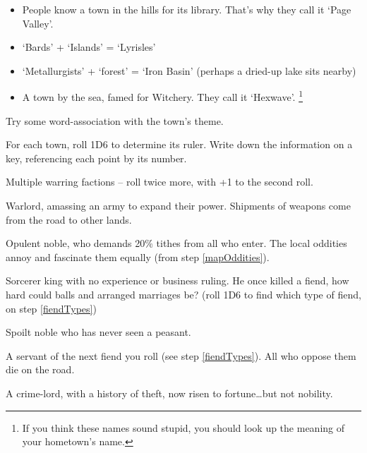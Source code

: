 \begin{multicols}{2}
\begin{itemize}
  \item
  People know a town in the hills for its library. That's why they call
  it `Page Valley'.
  \item
  `Bards' + `Islands' = `Lyrisles'
  \item
  `Metallurgists' + `forest' = `Iron Basin' (perhaps a dried-up lake sits nearby)
  \item
  A town by the sea, famed for Witchery.
  They call it `Hexwave'.%
  \footnote{If you think these names sound stupid, you should look up the meaning of your hometown's name.}
\end{itemize}

Try some word-association with the town's theme.


For each town, roll 1D6 to determine its ruler.
Write down the information on a key, referencing each point by its number.

\begin{dlist}
  \item
  Multiple warring factions -- roll twice more, with +1 to the second roll.
  \item
  Warlord, amassing an army to expand their power.
  Shipments of weapons come from the road to other lands.
  \item
  Opulent noble, who demands 20\% tithes from all who enter.
  The local oddities annoy and fascinate them equally (from step \ref{mapOddities}).
  \item
  Sorcerer king with no experience or business ruling.
  He once killed a fiend, how hard could balls and arranged marriages be?
  (roll 1D6 to find which type of fiend, on step \ref{fiendTypes})
  \item
  Spoilt noble who has never seen a peasant.
  \item
  A servant of the next fiend you roll (see step \ref{fiendTypes}).
  All who oppose them die on the road.
  \item
  A crime-lord, with a history of theft, now risen to fortune\ldots but not nobility.

\end{dlist}



\end{multicols}
